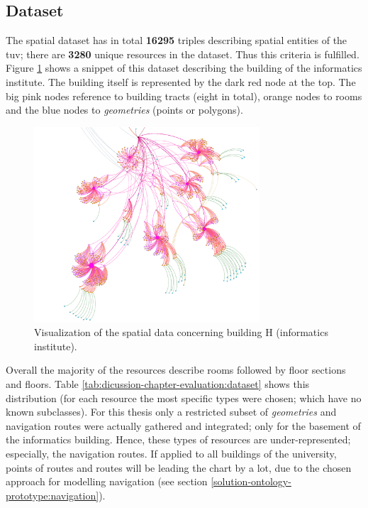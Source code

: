 \documentclass[draft,final]{vutinfth} %
\begin{document}
\subsection{Dataset}
\label{dicussion-chapter-evaluation:dataset}
The spatial dataset has in total \textbf{16295} triples describing spatial entities of the \gls{tuv}; there are \textbf{3280} unique resources in the dataset. Thus this criteria is fulfilled. Figure \ref{fig:dicussion-chapter-evaluation:dataset} shows a snippet of this dataset describing the building of the informatics institute. The building itself is represented by the dark red node at the top. The big pink nodes reference to building tracts (eight in total), orange nodes to rooms and the blue nodes to \textit{geometries} (points or polygons). 

\begin{figure}[h]
    \centering
    \includegraphics[width=0.75\textwidth]{graphics/evaluation/spatialDatasetBuildingHSnippet.png}
    \caption{Visualization of the spatial data concerning building H (informatics institute).}
    \label{fig:dicussion-chapter-evaluation:dataset}
\end{figure}

Overall the majority of the resources describe rooms followed by floor sections and floors. Table \ref{tab:dicussion-chapter-evaluation:dataset} shows this distribution (for each resource the most specific types were chosen; which have no known subclasses). For this thesis only a restricted subset of \textit{geometries} and navigation routes were actually gathered and integrated; only for the basement of the informatics building. Hence, these types of resources are under-represented; especially, the navigation routes. If applied to  all buildings of the university, points of routes and routes will be leading the chart by a lot, due to the chosen approach for modelling navigation (see section \ref{solution-ontology-prototype:navigation}).
\end{document}
